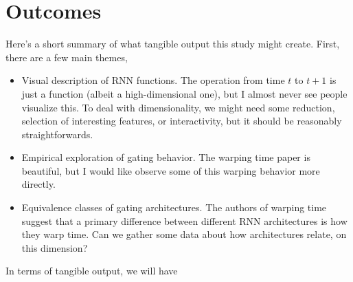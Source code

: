 \documentclass{article}
\begin{document}
\section{Outcomes}
\label{sec:outcomes}

 Here's a short summary of what tangible output this study might create. First,
 there are a few main themes,
\begin{itemize}
  \item Visual description of RNN functions. The operation from time $t$ to $t +
    1$ is just a function (albeit a high-dimensional one), but I almost never
    see people visualize this. To deal with dimensionality, we might need some
    reduction, selection of interesting features, or interactivity, but it
    should be reasonably straightforwards.
  \item Empirical exploration of gating behavior. The warping time paper is
    beautiful, but I would like observe some of this warping behavior more
    directly.
  \item Equivalence classes of gating architectures. The authors of warping time
    suggest that a primary difference between different RNN architectures is how
    they warp time. Can we gather some data about how architectures relate, on
    this dimension?
\end{itemize}

In terms of tangible output, we will have
\end{document}
